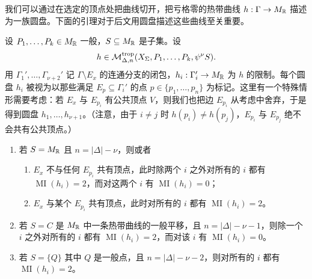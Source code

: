 
我们可以通过在选定的顶点处把曲线切开，把亏格零的热带曲线 $h:\Gamma\to M_{\mathbb{R}}$ 描述为一族圆盘。下面的引理对于后文用圆盘描述这些曲线至关重要。

\begin{lemma}
设 $P_1,\ldots,P_k\in M_{\mathbb{R}}$ 一般，$S\subseteq M_{\mathbb{R}}$ 是子集。设
\[
  h\in\mathcal{M}^{\mathrm{trop}}_{\Delta,n}(X_\Sigma,P_1,\ldots,P_k,\psi^\nu S).
\]
用 $\Gamma_1',\ldots,\Gamma_{\nu+2}'$ 记 $\Gamma\setminus E_x$ 的连通分支的闭包，$h_i:\Gamma_i'\to M_{\mathbb{R}}$ 为 $h$ 的限制。每个圆盘 $h_i$ 被视为以那些满足 $E_p\subseteq\Gamma_i'$ 的点 $p\in\{p_1,\ldots,p_n\}$ 为标记。这里有一个特殊情形需要考虑：若 $E_x$ 与 $E_{p_i}$ 有公共顶点 $V$，则我们也把边 $E_{p_i}$ 从考虑中舍弃，于是得到圆盘 $h_1,\ldots,h_{\nu+1}$。（注意，由于 $i\ne j$ 时 $h(p_i)\ne h(p_j)$，$E_{p_i}$ 与 $E_{p_j}$ 绝不会共有公共顶点。）
\begin{enumerate}[label=(\arabic*),leftmargin=2.2em,itemsep=1pt]
\item 若 $S=M_{\mathbb{R}}$ 且 $n=|\Delta|-\nu$，则或者
  \begin{enumerate}[label=(\alph*),leftmargin=2.2em,itemsep=1pt]
  \item $E_x$ 不与任何 $E_{p_i}$ 共有顶点，此时除两个 $i$ 之外对所有的 $i$ 都有 $\operatorname{MI}(h_i)=2$，而对这两个 $i$ 有 $\operatorname{MI}(h_i)=0$；
  \item $E_x$ 与某个 $E_{p_i}$ 共有顶点，此时对所有的 $i$ 都有 $\operatorname{MI}(h_i)=2$。
  \end{enumerate}
\item 若 $S=C$ 是 $M_{\mathbb{R}}$ 中一条热带曲线的一般平移，且 $n=|\Delta|-\nu-1$，则除一个 $i$ 之外对所有的 $i$ 都有 $\operatorname{MI}(h_i)=2$，而对该 $i$ 有 $\operatorname{MI}(h_i)=0$。
\item 若 $S=\{Q\}$ 其中 $Q$ 是一般点，且 $n=|\Delta|-\nu-2$，则对所有的 $i$ 都有 $\operatorname{MI}(h_i)=2$。
\end{enumerate}
\end{lemma}

